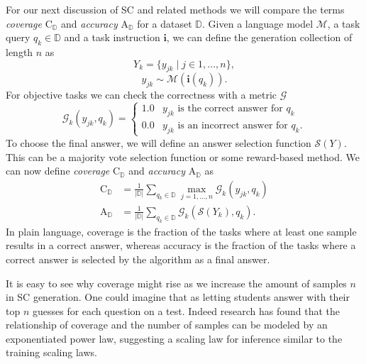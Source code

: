 For our next discussion of SC and related methods we will compare the 
terms \textit{coverage} $\mathrm{C}_{\mathbb{D}}$ and \textit{accuracy} $\mathrm{A}_{\mathbb{D}}$ for a dataset ${\mathbb{D}}$.
Given a language model $\mathcal{M}$, a task query $q_k \in {\mathbb{D}}$ and a task 
instruction $\mathbf{i}$, we can define the generation collection of length $n$ as
\begin{equation}
    Y_k = \{y_{jk}\mid j \in 1, ..., n\},
\end{equation}
\begin{equation}
    y_{jk} \sim \mathcal{M}(\mathbf{i}(q_k)).
\end{equation}
For objective tasks we can check the correctness with a metric $\mathcal{G}$
\begin{equation}
    \mathcal{G}_{k}(y_{jk}, q_k) = 
    \begin{cases}
        1.0 & y_{jk} \text{ is the correct answer for } q_k\\
        0.0 & y_{jk} \text{ is an incorrect answer for } q_k.
    \end{cases}
\end{equation}
To choose the final answer, we will define an answer selection function $\mathcal{S}(Y)$. 
This can be a majority vote selection function or some reward-based method.
We can now define \textit{coverage} $\mathrm{C}_{\mathbb{D}}$ and \textit{accuracy} $\mathrm{A}_{\mathbb{D}}$ as
\begin{align}
    \mathrm{C}_{\mathbb{D}} &= \frac{1}{|\mathbb{D}|} \sum_{q_k \in \mathbb{D}} \max_{j=1,...,n} \mathcal{G}_k(y_{jk}, q_k) \\
    \mathrm{A}_{\mathbb{D}} &= \frac{1}{|\mathbb{D}|} \sum_{q_k \in \mathbb{D}} \mathcal{G}_k\left( \mathcal{S}(Y_k), q_k \right).
\end{align}
In plain language, coverage is the fraction of the tasks where at least one sample results in a correct answer,
whereas accuracy is the fraction of the tasks where a correct answer is selected by the algorithm as a final answer.

It is easy to see why coverage might rise as we increase the amount of samples $n$ in SC generation.
One could imagine that as letting students answer with their top $n$ guesses for each question on a test. 
Indeed research\cite{brown2024largelanguagemonkeysscaling} has found that the relationship of coverage and the 
number of samples can be modeled by an exponentiated power law, suggesting a scaling law for inference
similar to the training scaling laws\cite{kaplan2020scalinglawsneurallanguage}.

